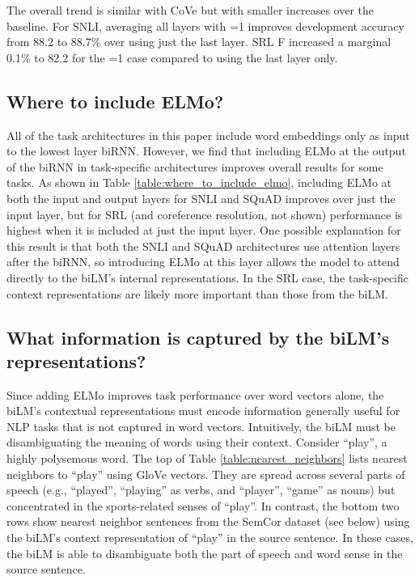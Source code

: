 \documentclass[11pt,a4paper]{article}
\newcommand{\ELMO}{ELMo}
\begin{document}
The overall trend is similar with CoVe but with smaller increases over the baseline.
For SNLI, averaging all layers with =1 improves development accuracy from 88.2 to 88.7\% over using just the last layer.
SRL F increased a marginal 0.1\% to 82.2 for the =1 case compared to using the last layer only.





\subsection{Where to include \ELMO?}
\label{sec:where_to_include_elmo}
All of the task architectures in this paper include word embeddings only as input to the lowest layer biRNN.
However, we find that including \ELMO{} at the output of the biRNN in task-specific architectures improves overall results for some tasks.
As shown in Table \ref{table:where_to_include_elmo}, including \ELMO{} at both the input and output layers for SNLI and SQuAD improves over just the input layer, but for SRL (and coreference resolution, not shown) performance is highest when it is included at just the input layer.
One possible explanation for this result is that both the SNLI and SQuAD architectures use attention layers after the biRNN, so introducing \ELMO{} at this layer allows the model to attend directly to the biLM's internal representations.
In the SRL case, the task-specific context representations are likely more important than those from the biLM.


\subsection{What information is captured by the biLM's representations?}
\label{sec:what_info_bilm}
Since adding \ELMO{} improves task performance over word vectors alone, the biLM's contextual representations must encode information generally useful for NLP tasks that is not captured in word vectors.  Intuitively, the biLM must be disambiguating the meaning of words using their context.
Consider ``play'', a highly polysemous word.  The top of Table \ref{table:nearest_neighbors} lists nearest neighbors to ``play'' using GloVe vectors.
They are spread across several parts of speech (e.g., ``played'', ``playing'' as verbs, and ``player'', ``game'' as nouns) but concentrated in the sports-related senses of ``play''.
In contrast, the bottom two rows show nearest neighbor sentences from the SemCor dataset (see below) using the biLM's context representation of ``play'' in the source sentence.
In these cases, the biLM is able to disambiguate both the part of speech and word sense in the source sentence.
\end{document}

